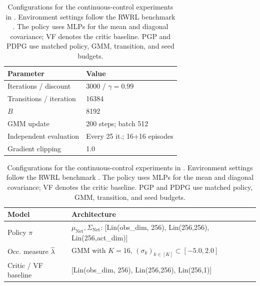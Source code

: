 \documentclass{article}
\theoremstyle{plain}
\theoremstyle{definition}
\theoremstyle{remark}
\def\lambdaHat{{\widehat{\lambda}}}
\newcommand{\setm}[1]{[#1]}
\begin{document}
\begin{table}[p]
 \begin{minipage}[t]{.43\linewidth}
  \centering
  \begin{tabular}{@{}p{.55\linewidth}p{.38\linewidth}@{}}
   \toprule
   Parameter               & Value                        \\\midrule
   Iterations / discount   & $3000$ / $\gamma=0.99$       \\
   Transitions / iteration & 16384                        \\
   $B$                     & 8192                         \\
   GMM update              & 200 steps; batch 512         \\
   Independent evaluation  & Every 25 it.; 16+16 episodes \\
   Gradient clipping       & 1.0                          \\\bottomrule
  \end{tabular}
  \label{tab:CartpoleTrainingParameters}
 \end{minipage}
 \hfill
 \begin{minipage}[t]{.55\linewidth}
  \centering
  \begin{tabular}{@{}p{.28\linewidth}p{.66\linewidth}@{}}
   \toprule
   Model                     & Architecture                      \\
   \midrule
   Policy $\pi$              &
   $\mu_{\mathrm{Net}},\Sigma_{\mathrm{Net}}$:
   [Lin(obs\_dim, 256), Lin(256,256), Lin(256,act\_dim)]         \\
   Occ. measure $\lambdaHat$ &
   GMM with $K=16$, $(\sigma_k)_{k\in\setm{K}}\subset[-5.0,2.0]$ \\
   Critic / VF baseline      &
   [Lin(obs\_dim, 256), Lin(256,256), Lin(256,1)]
   \\ \bottomrule
  \end{tabular}
  \label{tab:CartpoleModelArchitectures}
 \end{minipage}
 \caption{{Configurations for the continuous-control experiments in
    . Environment settings follow the RWRL
    benchmark \cite{dulac-arnoldChallengesRealworldReinforcement2021}. The policy
    uses MLPs for the mean and diagonal covariance; VF denotes the critic
    baseline. PGP and PDPG use matched policy, GMM, transition, and seed budgets.}}
 \label{tab:ConfigurationCartpole}
\end{table}
\end{document}

